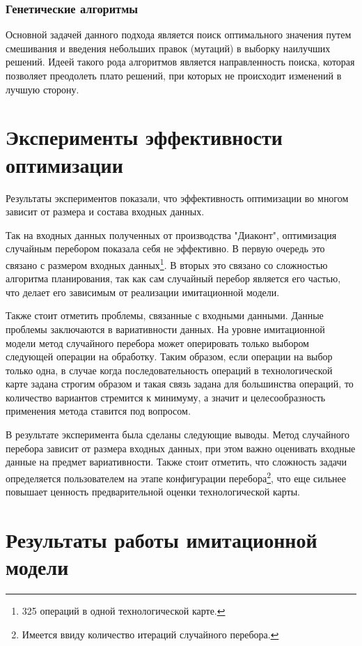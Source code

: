 \subsubsection*{Генетические алгоритмы}
Основной задачей данного подхода является поиск оптимального значения путем смешивания и введения небольших правок (мутаций) в выборку наилучших решений.
Идеей такого рода алгоритмов является направленность поиска, которая позволяет преодолеть плато решений, при которых не происходит изменений в лучшую сторону. 


\section*{Эксперименты эффективности оптимизации}
\label{experiment}
Результаты экспериментов показали, что эффективность оптимизации во многом зависит от размера и состава входных данных.

Так на входных данных полученных от производства "Диаконт", оптимизация случайным перебором показала себя не эффективно. В первую очередь это связано с размером входных данных\footnote{325 операций в одной технологической карте.}. В вторых это связано со сложностью алгоритма планирования, так как сам случайный перебор является его частью, что делает его зависимым от реализации имитационной модели.

Также стоит отметить проблемы, связанные с входными данными. Данные проблемы заключаются в вариативности данных. На уровне имитационной модели метод случайного перебора может оперировать только выбором следующей операции на обработку. Таким образом, если операции на выбор только одна, в случае когда последовательность операций в технологической карте задана строгим образом и такая связь задана для большинства операций, то количество вариантов стремится к минимуму, а значит и целесообразность применения метода ставится под вопросом.

В результате эксперимента была сделаны следующие выводы. Метод случайного перебора зависит от размера входных данных, при этом важно оценивать входные данные на предмет вариативности. Также стоит отметить, что сложность задачи определяется пользователем на этапе конфигурации перебора\footnote{Имеется ввиду количество итераций случайного перебора.}, что еще сильнее повышает ценность предварительной оценки технологической карты.

\section{Результаты работы имитационной модели}

